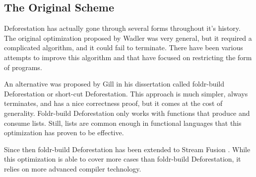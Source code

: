 \documentclass{book}
\theoremstyle{definition}
\begin{document}
\subsection{The Original Scheme}
Deforestation has actually gone through several forms throughout it's history.
The original optimization proposed by Wadler \cite{deforestationWadler}
was very general, but it required a complicated algorithm, and it could fail to terminate.
There have been various attempts to improve this algorithm \cite{turchin_supercompiler} and 
\cite{wadler_ferguson_deforest}
that have focused on restricting the form of programs.

An alternative was proposed by Gill in his dissertation \cite{gill_dissertation, shortcutDeforestation}
called \mbox{foldr-build} Deforestation or short-cut Deforestation. 
This approach is much simpler, always terminates, and has a nice correctness proof,
but it comes at the cost of generality.
\mbox{Foldr-build} Deforestation only works with functions that produce and consume lists.
Still, lists are common enough in functional languages that this optimization has proven to be effective.

Since then \mbox{foldr-build} Deforestation has been extended to Stream Fusion \cite{stream}.
While this optimization is able to cover more cases than \mbox{foldr-build} Deforestation,
it relies on more advanced compiler technology.
\end{document}
